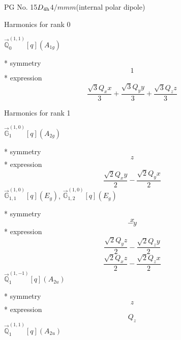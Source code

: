 \documentclass[fleqn,8pt]{jsarticle}
\begin{document}
\setcounter{MaxMatrixCols}{32}

\renewcommand{\tablename}{Table~}
\renewcommand{\figurename}{Figure~}
\begin{center}
\LARGE
PG No. 15\quad$D_{\rm 4h}$\quad$4/mmm$\quad[ tetragonal ] (internal polar dipole)
\end{center}

\noindent * Harmonics for rank 0

\noindent\quad $\vec{\mathbb{Q}}_{0}^{(1,1)}[q](A_{1g})$

\noindent\quad ** symmetry
\begin{dmath*}
1
\end{dmath*}
\noindent\quad ** expression
\begin{dmath*}
\frac{\sqrt{3} Q_{x} x}{3} + \frac{\sqrt{3} Q_{y} y}{3} + \frac{\sqrt{3} Q_{z} z}{3}
\end{dmath*}

\noindent * Harmonics for rank 1

\noindent\quad $\vec{\mathbb{G}}_{1}^{(1,0)}[q](A_{2g})$

\noindent\quad ** symmetry
\begin{dmath*}
z
\end{dmath*}
\noindent\quad ** expression
\begin{dmath*}
\frac{\sqrt{2} Q_{x} y}{2} - \frac{\sqrt{2} Q_{y} x}{2}
\end{dmath*}
\noindent\quad $\vec{\mathbb{G}}_{1,1}^{(1,0)}[q](E_{g})$, $\vec{\mathbb{G}}_{1,2}^{(1,0)}[q](E_{g})$

\noindent\quad ** symmetry
\begin{dmath*}
x
\end{dmath*}
\begin{dmath*}
- y
\end{dmath*}
\noindent\quad ** expression
\begin{dmath*}
\frac{\sqrt{2} Q_{y} z}{2} - \frac{\sqrt{2} Q_{z} y}{2}
\end{dmath*}
\begin{dmath*}
\frac{\sqrt{2} Q_{x} z}{2} - \frac{\sqrt{2} Q_{z} x}{2}
\end{dmath*}
\noindent\quad $\vec{\mathbb{Q}}_{1}^{(1,-1)}[q](A_{2u})$

\noindent\quad ** symmetry
\begin{dmath*}
z
\end{dmath*}
\noindent\quad ** expression
\begin{dmath*}
Q_{z}
\end{dmath*}
\noindent\quad $\vec{\mathbb{Q}}_{1}^{(1,1)}[q](A_{2u})$
\end{document}
